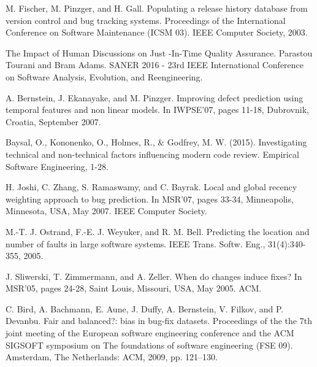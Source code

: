 %
%

%
% 
% 
%
\begin{thebibliography}{99.}
%
%
%
 M. Fischer, M. Pinzger, and H. Gall. Populating a release history database from version 
control and bug tracking systems. Proceedings of the International Conference on Software Maintenance 
(ICSM 03). IEEE Computer Society, 2003.

 The Impact of Human Discussions on Just
-In-Time Quality Assurance. Parastou Tourani and Bram Adams. SANER 2016 - 
23rd IEEE International Conference on Software Analysis, Evolution, and Reengineering.

  A. Bernstein, J. Ekanayake, and M. Pinzger. Improving defect prediction 
using temporal features and non linear models. In IWPSE'07, pages 11-18, Dubrovnik, Croatia,
September 2007.

 Baysal, O., Kononenko, O., Holmes, R., \& Godfrey, M. W. (2015). Investigating 
technical and non-technical factors influencing modern code review. Empirical Software Engineering, 
1-28.

 H. Joshi, C. Zhang, S. Ramaswamy, and C. Bayrak. Local and global recency 
weighting approach to bug prediction. In MSR'07, pages 33-34, Minneapolis, Minnesota, USA,
May 2007. IEEE Computer Society.

 M.-T. J. Ostrand, F.-E. J. Weyuker, and R. M. Bell. Predicting the location 
and number of faults in large software systems. IEEE Trans. Softw. Eng., 31(4):340-355, 2005.

 J. Sliwerski, T. Zimmermann, and A. Zeller. When do changes induce fixes? In 
MSR'05, pages 24-28, Saint Louis, Missouri, USA, May 2005. ACM.

 C. Bird, A. Bachmann, E. Aune, J. Duffy, A. Bernstein, V. Filkov, and P. Devanbu. 
Fair and balanced?: bias in bug-fix  datasets. Proceedings of the the 7th joint meeting of the 
European software engineering conference and the ACM SIGSOFT symposium on The foundations of 
software engineering (FSE 09). Amsterdam, The Netherlands: ACM, 2009, pp. 121–130.


\end{thebibliography}
